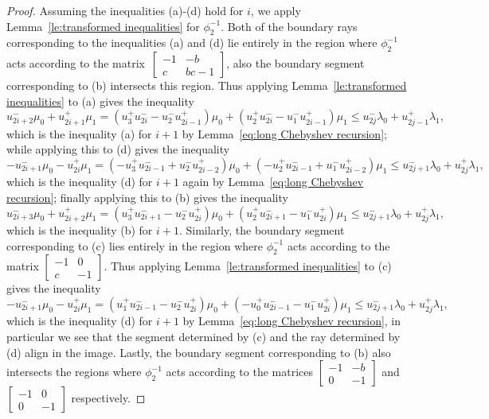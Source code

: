 \documentclass[pdflatex,sn-mathphys]{sn-jnl}%
\theoremstyle{thmstyleone}%
\theoremstyle{thmstyletwo}%
\theoremstyle{thmstylethree}%
\begin{document}
\begin{proof}
    Assuming the inequalities (a)-(d) hold for $i$, we apply Lemma~\ref{le:transformed inequalities} for $\phi_2^{-1}$.
    Both of the boundary rays corresponding to the inequalities (a) and (d) lie entirely in the region where $\phi_2^{-1}$ acts according to the matrix~$\left[ \begin{array}{cc} -1 & -b\\ c & bc-1 \end{array}\right]$, also the boundary segment corresponding to (b) intersects this region.
    Thus applying Lemma~\ref{le:transformed inequalities} to (a) gives the inequality 
    \[u_{2i+2}^-\mu_0+u_{2i+1}^+\mu_1=(u_3^+u_{2i}^--u_2^-u_{2i-1}^+)\mu_0+(u_2^+u_{2i}^--u_1^-u_{2i-1}^+)\mu_1\le u_{2j}^-\lambda_0+u_{2j-1}^+\lambda_1,\]
    which is the inequality (a) for $i+1$ by Lemma~\ref{eq:long Chebyshev recursion}; while applying this to (d) gives the inequality 
    \[-u_{2i+1}^-\mu_0-u_{2i}^+\mu_1=(-u_3^+u_{2i-1}^-+u_2^-u_{2i-2}^+)\mu_0+(-u_2^+u_{2i-1}^-+u_1^-u_{2i-2}^+)\mu_1\le u_{2j+1}^-\lambda_0+u_{2j}^+\lambda_1,\]
    which is the inequality (d) for $i+1$ again by Lemma~\ref{eq:long Chebyshev recursion}; finally applying this to (b) gives the inequality 
    \[u_{2i+3}^-\mu_0+u_{2i+2}^+\mu_1=(u_3^+u_{2i+1}^--u_2^-u_{2i}^+)\mu_0+(u_2^+u_{2i+1}^--u_1^-u_{2i}^+)\mu_1\le u_{2j+1}^-\lambda_0+u_{2j}^+\lambda_1,\]
    which is the inequality (b) for $i+1$.
    Similarly, the boundary segment corresponding to (c) lies entirely in the region where $\phi_2^{-1}$ acts according to the matrix $\left[ \begin{array}{cc} -1 & 0\\ c & -1 \end{array}\right]$.
    Thus applying Lemma~\ref{le:transformed inequalities} to (c) gives the inequality 
    \[-u_{2i+1}^-\mu_0-u_{2i}^+\mu_1=(u_1^+u_{2i-1}^--u_2^-u_{2i}^+)\mu_0+(-u_0^+u_{2i-1}^--u_1^-u_{2i}^+)\mu_1\le u_{2j+1}^-\lambda_0+u_{2j}^+\lambda_1,\]
    which is the inequality (d) for $i+1$ by Lemma~\ref{eq:long Chebyshev recursion}, in particular we see that the segment determined by (c) and the ray determined by (d) align in the image.
    Lastly, the boundary segment corresponding to (b) also intersects the regions where $\phi_2^{-1}$ acts according to the matrices $\left[ \begin{array}{cc} -1 & -b\\ 0 & -1 \end{array}\right]$ and $\left[ \begin{array}{cc} -1 & 0\\ 0 & -1 \end{array}\right]$ respectively.

\end{proof}
\end{document}
